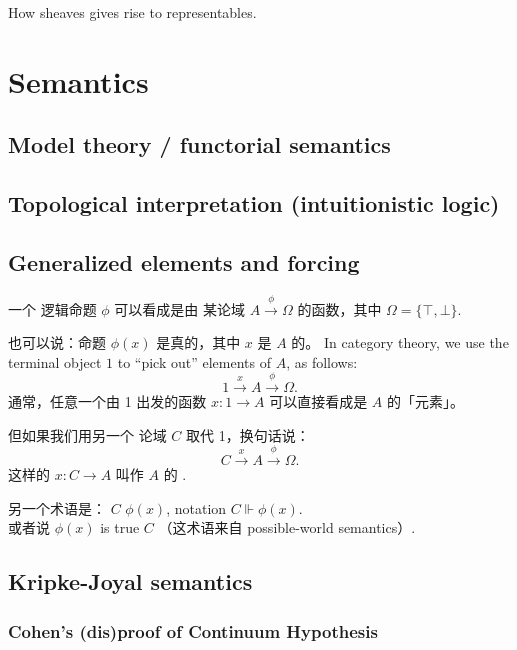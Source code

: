 How sheaves gives rise to representables.

\section{Semantics}

\subsection{Model theory / functorial semantics}

\subsection{Topological interpretation (intuitionistic logic)}

\subsection{Generalized elements and forcing}

一个 逻辑命题 $\phi$ 可以看成是由 某论域 $A \stackrel{\phi}{\rightarrow} \Omega$ 的函数，其中 $\Omega = \{ \top, \bot \}$.

也可以说：命题 $\phi(x)$ 是真的，其中 $x$ 是 $A$ 的。 In category theory, we use the terminal object $1$ to ``pick out'' elements of $A$, as follows:
\begin{equation}
1 \stackrel{x}{\rightarrow} A \stackrel{\phi}{\rightarrow} \Omega.
\end{equation}
通常，任意一个由 1 出发的函数 $x: 1 \rightarrow A$ 可以直接看成是 $A$ 的「元素」。

但如果我们用另一个 论域 $C$ 取代 1，换句话说：
\begin{equation}
C \stackrel{x}{\rightarrow} A \stackrel{\phi}{\rightarrow} \Omega.
\end{equation}
这样的 $x: C \rightarrow A$ 叫作 $A$ 的 .

另一个术语是： $C$  $\phi(x)$, notation $C \Vdash \phi(x)$. \\
或者说 $\phi(x)$ is true  $C$ （这术语来自 possible-world semantics）.

\subsection{Kripke-Joyal semantics}

\subsubsection{Cohen's (dis)proof of Continuum Hypothesis}

